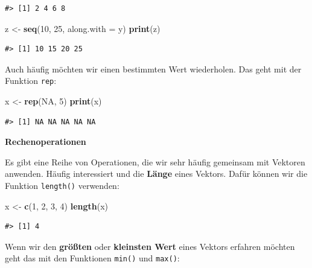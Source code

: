 \documentclass[]{tufte-book}
\newenvironment{Shaded}{}{}
\newcommand{\KeywordTok}[1]{\textcolor[rgb]{0.00,0.44,0.13}{\textbf{#1}}}
\newcommand{\DataTypeTok}[1]{\textcolor[rgb]{0.56,0.13,0.00}{#1}}
\newcommand{\DecValTok}[1]{\textcolor[rgb]{0.25,0.63,0.44}{#1}}
\newcommand{\StringTok}[1]{\textcolor[rgb]{0.25,0.44,0.63}{#1}}
\newcommand{\OtherTok}[1]{\textcolor[rgb]{0.00,0.44,0.13}{#1}}
\newcommand{\NormalTok}[1]{#1}
\begin{document}
\begin{verbatim}
#> [1] 2 4 6 8
\end{verbatim}

\begin{Shaded}
\begin{Highlighting}[]
\NormalTok{z <-}\StringTok{ }\KeywordTok{seq}\NormalTok{(}\DecValTok{10}\NormalTok{, }\DecValTok{25}\NormalTok{, }\DataTypeTok{along.with =}\NormalTok{ y)}
\KeywordTok{print}\NormalTok{(z)}
\end{Highlighting}
\end{Shaded}

\begin{verbatim}
#> [1] 10 15 20 25
\end{verbatim}

Auch häufig möchten wir einen bestimmten Wert wiederholen. Das geht mit
der Funktion \texttt{rep}:

\begin{Shaded}
\begin{Highlighting}[]
\NormalTok{x <-}\StringTok{ }\KeywordTok{rep}\NormalTok{(}\OtherTok{NA}\NormalTok{, }\DecValTok{5}\NormalTok{)}
\KeywordTok{print}\NormalTok{(x)}
\end{Highlighting}
\end{Shaded}

\begin{verbatim}
#> [1] NA NA NA NA NA
\end{verbatim}

\textbf{Rechenoperationen}

Es gibt eine Reihe von Operationen, die wir sehr häufig gemeinsam mit
Vektoren anwenden. Häufig interessiert und die \textbf{Länge} eines
Vektors. Dafür können wir die Funktion \texttt{length()} verwenden:

\begin{Shaded}
\begin{Highlighting}[]
\NormalTok{x <-}\StringTok{ }\KeywordTok{c}\NormalTok{(}\DecValTok{1}\NormalTok{, }\DecValTok{2}\NormalTok{, }\DecValTok{3}\NormalTok{, }\DecValTok{4}\NormalTok{)}
\KeywordTok{length}\NormalTok{(x)}
\end{Highlighting}
\end{Shaded}

\begin{verbatim}
#> [1] 4
\end{verbatim}

Wenn wir den \textbf{größten} oder \textbf{kleinsten Wert} eines Vektors
erfahren möchten geht das mit den Funktionen \texttt{min()} und
\texttt{max()}:
\end{document}
